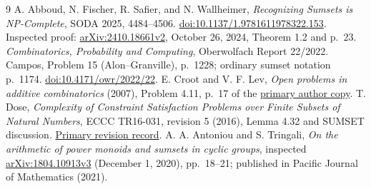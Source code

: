 \documentclass[11pt]{article}
\begin{document}
\begin{thebibliography}{9}
 A. Abboud, N. Fischer, R. Safier, and N. Wallheimer, \emph{Recognizing Sumsets is NP-Complete}, SODA 2025, 4484--4506. \href{https://doi.org/10.1137/1.9781611978322.153}{doi:10.1137/1.9781611978322.153}. Inspected proof: \href{https://arxiv.org/abs/2410.18661v2}{arXiv:2410.18661v2}, October 26, 2024, Theorem 1.2 and p.~23.
 \emph{Combinatorics, Probability and Computing}, Oberwolfach Report 22/2022. Campos, Problem 15 (Alon--Granville), p.~1228; ordinary sumset notation p.~1174. \href{https://doi.org/10.4171/owr/2022/22}{doi:10.4171/owr/2022/22}.
 E. Croot and V. F. Lev, \emph{Open problems in additive combinatorics} (2007), Problem 4.11, p.~17 of the \href{https://ecroot.math.gatech.edu/E2S-01-11.pdf}{primary author copy}.
 T. Dose, \emph{Complexity of Constraint Satisfaction Problems over Finite Subsets of Natural Numbers}, ECCC TR16-031, revision 5 (2016), Lemma 4.32 and SUMSET discussion. \href{https://eccc.weizmann.ac.il/report/2016/031/revision/5/}{Primary revision record}.
 A. A. Antoniou and S. Tringali, \emph{On the arithmetic of power monoids and sumsets in cyclic groups}, inspected \href{https://arxiv.org/abs/1804.10913v3}{arXiv:1804.10913v3} (December 1, 2020), pp.~18--21; published in Pacific Journal of Mathematics (2021).
\end{thebibliography}
\end{document}
